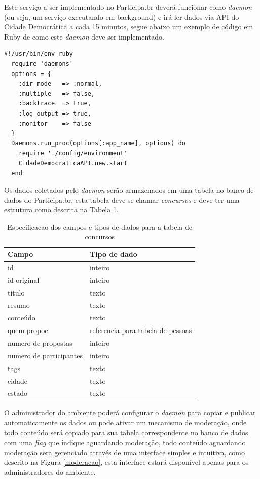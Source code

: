 \documentclass[12pt]{article}
\begin{document}
Este serviço a ser implementado no Participa.br deverá funcionar como {\it
daemon} (ou seja, um serviço executando em background) e irá ler dados via API
do Cidade Democrática a cada 15 minutos, segue abaixo um exemplo de código em
Ruby de como este {\it daemon} deve ser implementado.

\begin{framed}
\begin{lstlisting}[caption=Exemplo de código Ruby para o daemon]
  #!/usr/bin/env ruby
  require 'daemons'
  options = {
    :dir_mode   => :normal,
    :multiple   => false,
    :backtrace  => true,
    :log_output => true,
    :monitor    => false
  }
  Daemons.run_proc(options[:app_name], options) do
    require './config/environment'
    CidadeDemocraticaAPI.new.start
  end
\end{lstlisting}
\end{framed}

Os dados coletados pelo {\it daemon} serão armazenados em uma tabela no banco
de dados do Participa.br, esta tabela deve se chamar {\it concursos} e deve
ter uma estrutura como descrita na Tabela \ref{dados}.

\begin{table}[t]
\centering
\begin{tabular}{|l|l|}
  \hline
  Campo                   & Tipo de dado \\
  \hline
  id                      & inteiro \\
  id original             & inteiro \\
  titulo                  & texto \\
  resumo                  & texto \\
  conteúdo                & texto \\
  quem propoe             & referencia para tabela de pessoas \\
  numero de propostas     & inteiro \\
  numero de participantes & inteiro \\
  tags                    & texto \\
  cidade                  & texto \\
  estado                  & texto \\
  \hline
\end{tabular}
\caption{Especificacao dos campos e tipos de dados para a tabela de concursos}
\label{dados}
\end{table}

O administrador do ambiente poderá configurar o {\it daemon} para copiar e
publicar automaticamente os dados ou pode ativar um mecanismo de moderação,
onde todo conteúdo será copiado para sua tabela correspondente no
banco de dados com uma {\it flag} que indique aguardando moderação, todo conteúdo
aguardando moderação sera gerenciado através de uma interface simples e
intuitiva, como descrito na Figura \ref{moderacao}, esta interface estará
disponível apenas para os administradores do ambiente.
\end{document}
